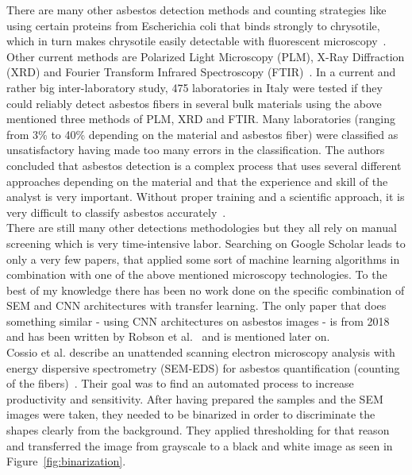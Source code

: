 There are many other asbestos detection methods and counting strategies like using certain proteins from Escherichia coli that binds strongly to chrysotile, which in turn makes chrysotile easily detectable with fluorescent microscopy~\cite{kuroda2008detection}. Other current methods are Polarized Light Microscopy (PLM), X-Ray Diffraction (XRD) and Fourier Transform Infrared Spectroscopy (FTIR)~\cite{campopiano2018inter}. In a current and rather big inter-laboratory study, 475 laboratories in Italy were tested if they could reliably detect asbestos fibers in several bulk materials using the above mentioned three methods of PLM, XRD and FTIR. Many laboratories (ranging from 3\% to 40\% depending on the material and asbestos fiber) were classified as unsatisfactory having made too many errors in the classification. The authors concluded that asbestos detection is a complex process that uses several different approaches depending on the material and that the experience and skill of the analyst is very important. Without proper training and a scientific approach, it is very difficult to classify asbestos accurately~\cite{campopiano2018inter}. \\

There are still many other detections methodologies but they all rely on manual screening which is very time-intensive labor. Searching on Google Scholar leads to only a very few papers, that applied some sort of machine learning algorithms in combination with one of the above mentioned microscopy technologies. To the best of my knowledge there has been no work done on the specific combination of SEM and CNN architectures with transfer learning. The only paper that does something similar - using CNN architectures on asbestos images - is from 2018 and has been written by Robson et al.~\cite{robson2018fiac} and is mentioned later on. \\

Cossio et al. describe an unattended scanning electron microscopy analysis with energy dispersive spectrometry (SEM-EDS) for asbestos quantification (counting of the fibers)~\cite{cossio2018innovative}. Their goal was to find an automated process to increase productivity and sensitivity. After having prepared the samples and the SEM images were taken, they needed to be binarized in order to discriminate the shapes clearly from the background. They applied thresholding for that reason and transferred the image from grayscale to a black and white image as seen in Figure~\ref{fig:binarization}.


